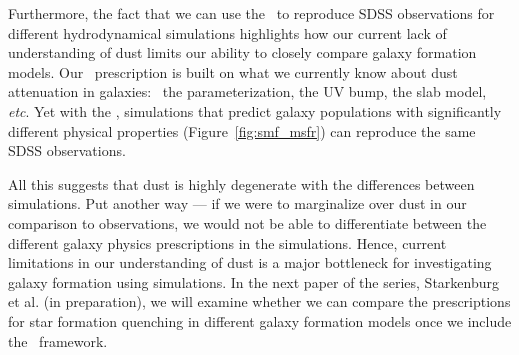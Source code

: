 Furthermore, the fact that we can use the \eda~to reproduce SDSS observations 
for different hydrodynamical simulations highlights how our current lack of 
understanding of dust limits our ability to closely compare galaxy
formation models. 
Our \eda~prescription is built on what we currently know about dust attenuation
in galaxies: \eg~the \citealt{noll2009} parameterization, the UV bump, the slab
model, \emph{etc}.
Yet with the \eda, simulations that predict galaxy populations with
significantly different physical properties (Figure~\ref{fig:smf_msfr}) can
reproduce the same SDSS observations. 

All this suggests that dust is highly degenerate with the differences between simulations. 
Put another way --- if we were to marginalize over dust in our comparison to
observations, we would not be able to differentiate between the different
galaxy physics prescriptions in the simulations. 
Hence, current limitations in our understanding of dust is a major bottleneck
for investigating galaxy formation using simulations.
In the next paper of the series, Starkenburg et al. (in preparation), we
will examine whether we can compare the prescriptions for star formation
quenching in different galaxy formation models once we include the
\eda~framework.


